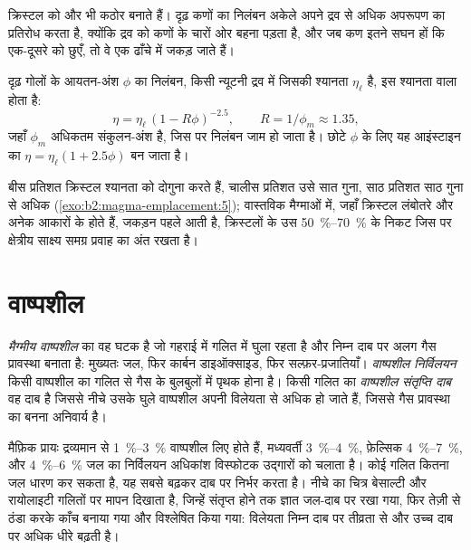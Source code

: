 क्रिस्टल  को और भी कठोर बनाते हैं। दृढ़ कणों का निलंबन
अकेले अपने द्रव से अधिक अपरूपण का प्रतिरोध करता है, क्योंकि द्रव को कणों के चारों ओर
बहना पड़ता है, और जब कण इतने सघन हों कि एक-दूसरे को छुएँ, तो वे एक
ढाँचे में जकड़ जाते हैं।

\begin{proposition}[आइंस्टाइन--रॉस्को संबंध]\label{prop:b2:magma-emplacement:roscoe}
दृढ़ गोलों के आयतन-अंश $\phi$ का निलंबन, किसी न्यूटनी द्रव में
जिसकी श्यानता $\eta_{\ell}$ है, इस श्यानता वाला होता है:
\[
\eta = \eta_{\ell}\,(1 - R\phi)^{-2.5}, \qquad R = 1/\phi_m \approx 1.35,
\]
जहाँ $\phi_m$ अधिकतम संकुलन-अंश है, जिस पर निलंबन जाम हो जाता है।
छोटे $\phi$ के लिए यह आइंस्टाइन का $\eta = \eta_{\ell}(1 + 2.5\phi)$ बन जाता है।
\end{proposition}
\admitted

बीस प्रतिशत क्रिस्टल श्यानता को दोगुना करते हैं, चालीस प्रतिशत उसे सात गुना,
साठ प्रतिशत साठ गुना से अधिक (\cref{exo:b2:magma-emplacement:5}); वास्तविक मैग्माओं में, जहाँ
क्रिस्टल लंबोतरे और अनेक आकारों के होते हैं, जकड़न पहले आती है,
क्रिस्टलों के उस \qtyrange{50}{70}{\percent} के निकट जिस पर क्षेत्रीय साक्ष्य समग्र प्रवाह का
अंत रखता है।

\section{वाष्पशील}

\begin{definition}[मैग्मीय वाष्पशील]\label{def:b2:magma-emplacement:volatiles}
\emph{मैग्मीय वाष्पशील}  का वह घटक है जो
गहराई में गलित में घुला रहता है और निम्न दाब पर अलग गैस प्रावस्था बनाता है:
मुख्यतः जल, फिर कार्बन डाइऑक्साइड, फिर सल्फ़र-प्रजातियाँ। \emph{वाष्पशील
निर्विलयन} किसी वाष्पशील का गलित से गैस के बुलबुलों में
पृथक होना है। किसी गलित का \emph{वाष्पशील संतृप्ति
दाब} वह दाब है जिससे नीचे
उसके घुले वाष्पशील अपनी विलेयता से अधिक हो जाते हैं, जिससे गैस प्रावस्था का बनना अनिवार्य है।
\end{definition}

मैफ़िक  प्रायः द्रव्यमान से \qtyrange{1}{3}{\percent} वाष्पशील लिए होते हैं,
मध्यवर्ती  \qtyrange{3}{4}{\percent}, फ़ेल्सिक 
\qtyrange{4}{7}{\percent}, और \qtyrange{4}{6}{\percent} जल का
निर्विलयन अधिकांश विस्फोटक उद्गारों को चलाता है। कोई गलित कितना जल धारण कर सकता है, यह
सबसे बढ़कर दाब पर निर्भर करता है। नीचे का चित्र बेसाल्टी और
रायोलाइटी गलितों पर मापन दिखाता है, जिन्हें संतृप्त होने तक ज्ञात जल-दाब पर रखा गया, फिर
तेज़ी से ठंडा करके काँच बनाया गया और विश्लेषित किया गया: विलेयता निम्न दाब पर तीव्रता से और उच्च दाब पर
अधिक धीरे बढ़ती है।


